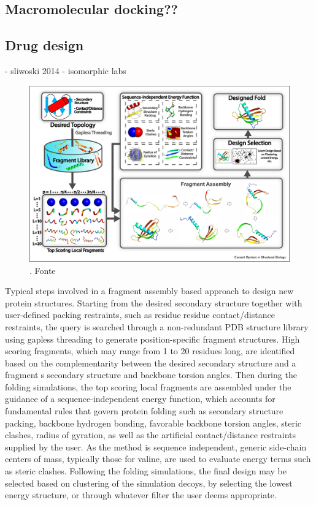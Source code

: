 \subsection{Macromolecular docking??}


\subsection{Drug design}
- sliwoski 2014
- isomorphic labs

\begin{figure}[!htb]
	\centering
	\includegraphics[scale=0.95]{images/fragment-assembly.jpg}
	\caption{. Fonte\cite{pearce2021deep}}
	\label{fig:fragment-assembly}
\end{figure}

Typical steps involved in a fragment assembly based approach to design new protein structures. Starting from the desired secondary structure together with user-defined packing restraints, such as residue⿿residue contact/distance restraints, the query is searched through a non-redundant PDB structure library using gapless threading to generate position-specific fragment structures. High scoring fragments, which may range from 1 to 20 residues long, are identified based on the complementarity between the desired secondary structure and a fragment⿿s secondary structure and backbone torsion angles. Then during the folding simulations, the top scoring local fragments are assembled under the guidance of a sequence-independent energy function, which accounts for fundamental rules that govern protein folding such as secondary structure packing, backbone hydrogen bonding, favorable backbone torsion angles, steric clashes, radius of gyration, as well as the artificial contact/distance restraints supplied by the user. As the method is sequence independent, generic side-chain centers of mass, typically those for valine, are used to evaluate energy terms such as steric clashes. Following the folding simulations, the final design may be selected based on clustering of the simulation decoys, by selecting the lowest energy structure, or through whatever filter the user deems appropriate.

